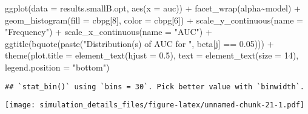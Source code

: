 \documentclass[
]{article}
\newenvironment{Shaded}{\begin{snugshade}}{\end{snugshade}}
\newcommand{\AttributeTok}[1]{\textcolor[rgb]{0.77,0.63,0.00}{#1}}
\newcommand{\DecValTok}[1]{\textcolor[rgb]{0.00,0.00,0.81}{#1}}
\newcommand{\FloatTok}[1]{\textcolor[rgb]{0.00,0.00,0.81}{#1}}
\newcommand{\FunctionTok}[1]{\textcolor[rgb]{0.00,0.00,0.00}{#1}}
\newcommand{\NormalTok}[1]{#1}
\newcommand{\SpecialCharTok}[1]{\textcolor[rgb]{0.00,0.00,0.00}{#1}}
\newcommand{\StringTok}[1]{\textcolor[rgb]{0.31,0.60,0.02}{#1}}
\begin{document}
\begin{Shaded}
\begin{Highlighting}[]
\FunctionTok{ggplot}\NormalTok{(}\AttributeTok{data =}\NormalTok{ results.smallB.opt,}
       \FunctionTok{aes}\NormalTok{(}\AttributeTok{x =}\NormalTok{ auc)) }\SpecialCharTok{+}
  \FunctionTok{facet\_wrap}\NormalTok{(alpha}\SpecialCharTok{\textasciitilde{}}\NormalTok{model) }\SpecialCharTok{+}
  \FunctionTok{geom\_histogram}\NormalTok{(}\AttributeTok{fill =}\NormalTok{ cbpg[}\DecValTok{8}\NormalTok{], }\AttributeTok{color =}\NormalTok{ cbpg[}\DecValTok{6}\NormalTok{]) }\SpecialCharTok{+}
  \FunctionTok{scale\_y\_continuous}\NormalTok{(}\AttributeTok{name =} \StringTok{"Frequency"}\NormalTok{) }\SpecialCharTok{+}
  \FunctionTok{scale\_x\_continuous}\NormalTok{(}\AttributeTok{name =} \StringTok{"AUC"}\NormalTok{) }\SpecialCharTok{+}
  \FunctionTok{ggtitle}\NormalTok{(}\FunctionTok{bquote}\NormalTok{(}\FunctionTok{paste}\NormalTok{(}\StringTok{"Distribution(s) of AUC for "}\NormalTok{, beta[j] }\SpecialCharTok{==} \FloatTok{0.05}\NormalTok{))) }\SpecialCharTok{+}
  \FunctionTok{theme}\NormalTok{(}\AttributeTok{plot.title =} \FunctionTok{element\_text}\NormalTok{(}\AttributeTok{hjust =} \FloatTok{0.5}\NormalTok{), }
        \AttributeTok{text =} \FunctionTok{element\_text}\NormalTok{(}\AttributeTok{size =} \DecValTok{14}\NormalTok{),}
        \AttributeTok{legend.position =} \StringTok{"bottom"}\NormalTok{)}
\end{Highlighting}
\end{Shaded}

\begin{verbatim}
## `stat_bin()` using `bins = 30`. Pick better value with `binwidth`.
\end{verbatim}

\texttt{[image: simulation\_details\_files/figure-latex/unnamed-chunk-21-1.pdf]}
\end{document}
